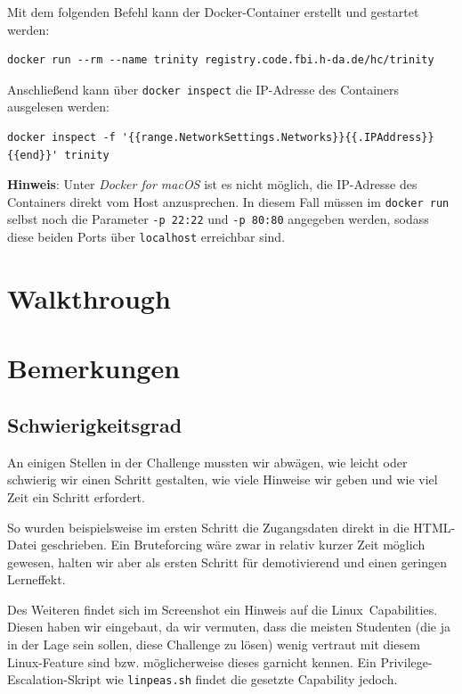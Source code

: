 \documentclass[parskip=half]{scrartcl}
\begin{document}
Mit dem folgenden Befehl kann der Docker-Container erstellt und gestartet werden:
\begin{lstlisting}
docker run --rm --name trinity registry.code.fbi.h-da.de/hc/trinity
\end{lstlisting}

Anschließend kann über \texttt{docker inspect} die IP-Adresse des Containers ausgelesen werden:
\begin{lstlisting}
docker inspect -f '{{range.NetworkSettings.Networks}}{{.IPAddress}}{{end}}' trinity
\end{lstlisting}

\textbf{Hinweis}: Unter \emph{Docker for macOS} ist es nicht möglich, die IP-Adresse des Containers direkt vom Host anzusprechen.
In diesem Fall müssen im \texttt{docker run} selbst noch die Parameter \texttt{-p 22:22} und \texttt{-p 80:80} angegeben werden, sodass diese beiden Ports über \texttt{localhost} erreichbar sind.

\section{Walkthrough}





\clearpage
\section{Bemerkungen}
\subsection{Schwierigkeitsgrad}
An einigen Stellen in der Challenge mussten wir abwägen, wie leicht oder schwierig wir einen Schritt gestalten, wie viele Hinweise wir geben und wie viel Zeit ein Schritt erfordert.

So wurden beispielsweise im ersten Schritt die Zugangsdaten direkt in die HTML-Datei geschrieben.
Ein Bruteforcing wäre zwar in relativ kurzer Zeit möglich gewesen, halten wir aber als ersten Schritt für demotivierend und einen geringen Lerneffekt.

Des Weiteren findet sich im Screenshot ein Hinweis auf die Linux~Capabilities.
Diesen haben wir eingebaut, da wir vermuten, dass die meisten Studenten (die ja in der Lage sein sollen, diese Challenge zu lösen) wenig vertraut mit diesem Linux-Feature sind bzw. möglicherweise dieses garnicht kennen.
Ein Privilege-Escalation-Skript wie \texttt{linpeas.sh} findet die gesetzte Capability jedoch.
\end{document}
